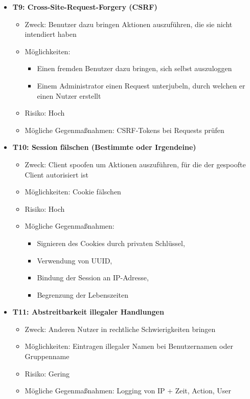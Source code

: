 \documentclass[12pt,DIV14,BCOR10mm,a4paper,parskip=half-,headsepline,headinclude,english,ngerman,bibliography=totocnumbered]{scrreprt}
\begin{document}
\begin{itemize}
  \hypertarget{threat9}{}
  \item \textbf{T9: Cross-Site-Request-Forgery (CSRF)}
  \begin{itemize}
  \item Zweck: Benutzer dazu bringen Aktionen auszuführen, die sie nicht intendiert haben
  \item Möglichkeiten:
  \begin{itemize}
          \item Einen fremden Benutzer dazu bringen, sich selbst auszuloggen
          \item Einem Administrator einen Request unterjubeln, durch welchen er einen Nutzer erstellt
  \end{itemize}
  \item Risiko: Hoch
  \item Mögliche Gegenmaßnahmen: CSRF-Tokens bei Requests prüfen
  \end{itemize}

  \hypertarget{threat10}{}
  \item \textbf{T10: Session fälschen (Bestimmte oder Irgendeine)}
  \begin{itemize}
  \item Zweck: Client spoofen um Aktionen auszuführen, für die der gespoofte Client autorisiert ist
  \item Möglichkeiten: Cookie fälschen
  \item Risiko: Hoch
  \item Mögliche Gegenmaßnahmen:
  \begin{itemize}
    \item Signieren des Cookies durch privaten Schlüssel,
    \item Verwendung von UUID,
    \item Bindung der Session an IP-Adresse,
    \item Begrenzung der Lebenszeiten
  \end{itemize}
  \end{itemize}

  \hypertarget{threat11}{}
  \item \textbf{T11: Abstreitbarkeit illegaler Handlungen}
  \begin{itemize}
  \item Zweck: Anderen Nutzer in rechtliche Schwierigkeiten bringen
  \item Möglichkeiten: Eintragen illegaler Namen bei Benutzernamen oder Gruppenname
  \item Risiko: Gering
  \item Mögliche Gegenmaßnahmen: Logging von IP + Zeit, Action, User
  \end{itemize}


\end{itemize}
\end{document}
